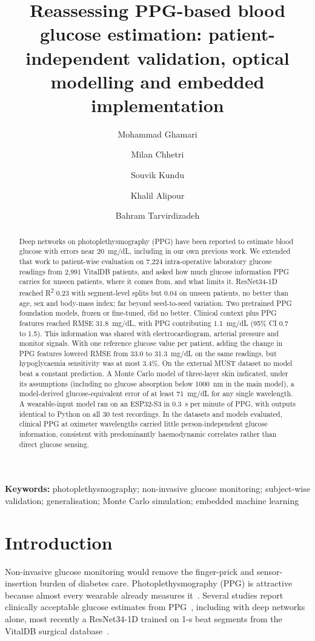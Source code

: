 \documentclass[11pt]{article}
\title{\sffamily\bfseries Reassessing PPG-based blood glucose estimation: patient-independent validation, optical modelling and embedded implementation}
\author[1]{Mohammad Ghamari}
\author[1]{Milan Chhetri}
\author[1]{Souvik Kundu}
\author[2]{Khalil Alipour}
\author[2]{Bahram Tarvirdizadeh}
\affil[1]{Department of Electrical Engineering, California Polytechnic State University, San Luis Obispo, CA, USA}
\affil[2]{Advanced Service Robots (ASR) Laboratory, Department of Mechatronics Engineering, School of Intelligent Systems Engineering, College of Interdisciplinary Science and Technology, University of Tehran, Tehran, Iran}
\date{}
\newcommand{\RR}{R\textsuperscript{2}}
\newcommand{\mgdl}{mg/dL}
\begin{document}
\maketitle
\thispagestyle{fancy}

\begin{abstract}
\noindent Deep networks on photoplethysmography (PPG) have been reported to estimate blood glucose with errors near 20~\mgdl{}, including in our own previous work. We extended that work to patient-wise evaluation on 7,224 intra-operative laboratory glucose readings from 2,991 VitalDB patients, and asked how much glucose information PPG carries for unseen patients, where it comes from, and what limits it. ResNet34-1D reached \RR{} 0.23 with segment-level splits but 0.04 on unseen patients, no better than age, sex and body-mass index; far beyond seed-to-seed variation. Two pretrained PPG foundation models, frozen or fine-tuned, did no better. Clinical context plus PPG features reached RMSE 31.8~\mgdl{}, with PPG contributing 1.1~\mgdl{} (95\% CI 0.7 to 1.5). This information was shared with electrocardiogram, arterial pressure and monitor signals. With one reference glucose value per patient, adding the change in PPG features lowered RMSE from 33.0 to 31.3~\mgdl{} on the same readings, but hypoglycaemia sensitivity was at most 3.4\%. On the external MUST dataset no model beat a constant prediction. A Monte Carlo model of three-layer skin indicated, under its assumptions (including no glucose absorption below 1000~nm in the main model), a model-derived glucose-equivalent error of at least 71~\mgdl{} for any single wavelength. A wearable-input model ran on an ESP32-S3 in 0.3~s per minute of PPG, with outputs identical to Python on all 30 test recordings. In the datasets and models evaluated, clinical PPG at oximeter wavelengths carried little person-independent glucose information, consistent with predominantly haemodynamic correlates rather than direct glucose sensing.
\end{abstract}

\noindent\textbf{Keywords:} photoplethysmography; non-invasive glucose monitoring; subject-wise validation; generalisation; Monte Carlo simulation; embedded machine learning

\section{Introduction}
Non-invasive glucose monitoring would remove the finger-prick and sensor-insertion burden of diabetes care. Photoplethysmography (PPG) is attractive because almost every wearable already measures it~\citep{allen2007,castaneda2018}. Several studies report clinically acceptable glucose estimates from PPG~\citep{montemoreno2011,chu2021,gupta2021,prabha2022}, including with deep networks alone, most recently a ResNet34-1D trained on 1-s beat segments from the VitalDB surgical database~\citep{zeynali2025,lee2022vitaldb}.
\end{document}
